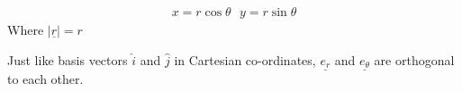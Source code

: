 \begin{definition}
	\begin{align*}
		x = r \cos \theta  \ \ \ y =  r \sin \theta
	\end{align*}
	Where $\mid \underline{r} \mid = r$
\end{definition}

\begin{note}
	Just like basis vectors $\hat{i}$ and $\hat{j}$ in Cartesian co-ordinates, $\underline{e_{r}}$ and $\underline{e_{\theta}}$ are orthogonal to each other.
\end{note}

\clearpage
